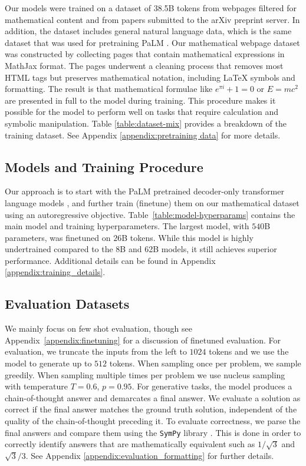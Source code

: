 Our models were trained on a dataset of 38.5B tokens from webpages filtered for mathematical content and from papers submitted to the arXiv preprint server. In addition, the dataset includes general natural language data, which is the same dataset that was used for pretraining {PaLM }\!\!. Our mathematical webpage dataset was constructed by collecting pages that contain mathematical expressions in MathJax format. The pages underwent a cleaning process that removes most HTML tags but preserves mathematical notation, including \LaTeX{} symbols and formatting. The result is that mathematical formulae like $e^{\pi i} + 1 = 0$ or $E=mc^2$ are presented in full to the model during training.  This procedure makes it possible for the model to perform well on tasks that require calculation and symbolic manipulation. Table \ref{table:dataset-mix} provides a breakdown of the training dataset. See Appendix \ref{appendix:pretraining data} for more details.

\subsection{Models and Training Procedure}
\label{sec:pretraining}

Our approach is to start with the {PaLM } pretrained decoder-only transformer language models \cite{palm}, and further train (finetune) them on our mathematical dataset using an autoregressive objective.
Table~\ref{table:model-hyperparams} contains the main model and training hyperparameters. The largest model, with $540$B parameters, was finetuned on $26$B tokens. While this model is highly undertrained compared to the 8B and 62B models, it still achieves superior performance. Additional details can be found in Appendix \ref{appendix:training_details}.

\subsection{Evaluation Datasets}
\label{sec:datasets}

We mainly focus on few shot evaluation, though see Appendix~\ref{appendix:finetuning} for a discussion of finetuned evaluation. For evaluation, we truncate the inputs from the left to $1024$ tokens and we use the model to generate up to $512$ tokens. When sampling once per problem, we sample greedily. When sampling multiple times per problem we use nucleus sampling \citep{nucleus_sampling} with temperature $T=0.6$, $p=0.95$. For generative tasks, the model produces a chain-of-thought answer and demarcates a final answer. We evaluate a solution as correct if the final answer matches the ground truth solution, independent of the quality of the chain-of-thought preceding it. To evaluate correctness, we parse the final answers and compare them using the \texttt{SymPy} library \citep{sympy}. This is done in order to correctly identify answers that are mathematically equivalent such as $1/\sqrt{3}$ and $\sqrt{3}/3$. See Appendix \ref{appendix:evaluation_formatting} for further details.


